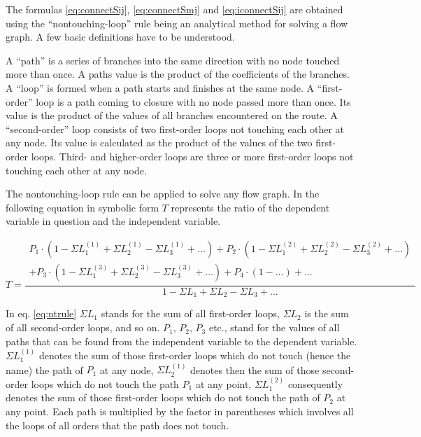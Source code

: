 \documentclass[10pt]{report}
\begin{document}
The formulas \eqref{eq:connectSij}, \eqref{eq:connectSmj} and
\eqref{eq:iconnectSij} are obtained using the ``nontouching-loop''
rule being an analytical method for solving a flow graph.  A few basic
definitions have to be understood.

\addvspace{12pt}

A ``path'' is a series of branches into the same direction with no
node touched more than once.  A paths value is the product of the
coefficients of the branches.  A ``loop'' is formed when a path starts
and finishes at the same node.  A ``first-order'' loop is a path
coming to closure with no node passed more than once.  Its value is
the product of the values of all branches encountered on the route.  A
``second-order'' loop consists of two first-order loops not touching
each other at any node.  Its value is calculated as the product of the
values of the two first-order loops.  Third- and higher-order loops
are three or more first-order loops not touching each other at any
node.

\addvspace{12pt}

The nontouching-loop rule can be applied to solve any flow graph.  In
the following equation in symbolic form $T$ represents the ratio of
the dependent variable in question and the independent variable.

\begin{equation}
T = \dfrac{
\begin{split}
P_{1}\cdot\left(1 - \Sigma L_{1}^{(1)} + \Sigma L_{2}^{(1)} - \Sigma L_{3}^{(1)} + \ldots\right) +
P_{2}\cdot\left(1 - \Sigma L_{1}^{(2)} + \Sigma L_{2}^{(2)} - \Sigma L_{3}^{(2)} + \ldots\right)\\ +
 P_{3}\cdot\left(1 - \Sigma L_{1}^{(3)} + \Sigma L_{2}^{(3)} - \Sigma L_{3}^{(3)} + \ldots\right) +
P_{4}\cdot\left(1 - \ldots\right) + \ldots
\end{split}
}{1 - \Sigma L_{1} + \Sigma L_{2} - \Sigma L_{3} + \ldots}
\label{eq:ntrule}
\end{equation}

In eq. \eqref{eq:ntrule} $\Sigma L_{1}$ stands for the sum of all
first-order loops, $\Sigma L_{2}$ is the sum of all second-order
loops, and so on.  $P_{1}$, $P_{2}$, $P_{3}$ etc., stand for the
values of all paths that can be found from the independent variable to
the dependent variable.  $\Sigma L_{1}^{(1)}$ denotes the sum of those
first-order loops which do not touch (hence the name) the path of
$P_{1}$ at any node, $\Sigma L_{2}^{(1)}$ denotes then the sum of
those second-order loops which do not touch the path $P_{1}$ at any
point, $\Sigma L_{1}^{(2)}$ consequently denotes the sum of those
first-order loops which do not touch the path of $P_{2}$ at any point.
Each path is multiplied by the factor in parentheses which involves
all the loops of all orders that the path does not touch.
\end{document}
